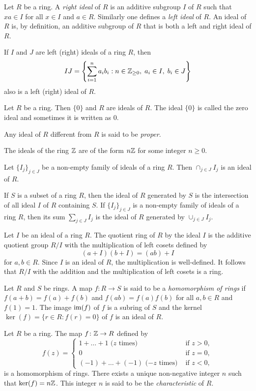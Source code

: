 Let $R$ be a ring. A \emph{right ideal} of $R$ is an additive subgroup $I$ of $R$ such that $xa\in I$ for all $x\in I$ and $a\in R$.
Similarly one defines a \emph{left ideal} 
of $R$. An ideal of $R$ is, by definition, an additive subgroup of $R$ that is
both a left and right ideal of $R$.


If $I$ and $J$ are left (right) ideals of a ring $R$, then
\[
IJ=\left\{\sum_{i=1}^{n} a_ib_i:n\in\mathbb{Z}_{\geq0},\; a_i\in I,\; b_i\in J\right\}
\]
also is a left (right) ideal of $R$.


\begin{example}
    Let $R$ be a ring. Then $\{ 0\}$ and $R$ are ideals of $R$. The ideal $\{ 0\}$
    is called the zero ideal and sometimes it is written as $0$.
\end{example}

Any ideal of $R$ different from $R$ is said to be {\em proper}.

\begin{example}
    The ideals of the ring $\mathbb{Z}$ are of the form $n\mathbb{Z}$ for some integer $n\geq0$.
\end{example}

\begin{example} 
    Let $\{I_j\}_{j\in J}$ be a non-empty family of ideals of a ring $R$. Then $\cap_{j\in J}I_j$ is an ideal of $R$.
\end{example}

If $S$ is a subset of a ring $R$, then the ideal of $R$ generated by $S$ 
is the intersection of all ideal $I$ of $R$ containing $S$. If
$\{I_j\}_{j\in J}$ is a non-empty family of ideals of a ring $R$, then its sum $\sum_{j\in J}I_j$ is the ideal of $R$ generated by
$\cup_{j\in  J}I_j$.

Let $I$ be an ideal of a ring $R$. The quotient ring of $R$ by the ideal $I$ is the additive quotient group
$R/I$ with the multiplication of left cosets defined by 
\[
(a+I)(b+I)=(ab)+I
\]
for $a,b\in R$. Since $I$ is an ideal of $R$, the multiplication is well-defined. It follows that 
$R/I$ with the addition and the multiplication of left cosets is a ring.


Let $R$ and $S$ be rings. A map $f\colon R\rightarrow S$
is said to be a {\em homomorphism of rings} if 
$f(a+b)=f(a)+f(b)$ and $f(ab)=f(a)f(b)$ for all $a,b\in R$ and $f(1)=1$.
The image $\operatorname{im}(f)$ of $f$ is a subring of $S$ and the kernel 
$\ker(f)=\{ r\in R: f(r)=0\}$ of $f$ is an ideal of $R$.

\begin{example}
Let  $R$ be a ring. The map $f\colon \mathbb{Z}\rightarrow R$ defined by
\[
f(z)=\begin{cases}
    1+\dots +1\mbox{ ($z$ times)}&\mbox{ if } z>0,\\
    0 &\mbox{ if } z=0,\\
    (-1)+\dots+(-1) \mbox{ ($-z$ times)}&\mbox{ if } z<0,
    \end{cases}
\]
is a homomorphism of rings. There exists a unique non-negative integer $n$ such that
$\ker(f)=n\mathbb{Z}$. This integer $n$ is said to be the {\em characteristic} of $R$.
\end{example}

